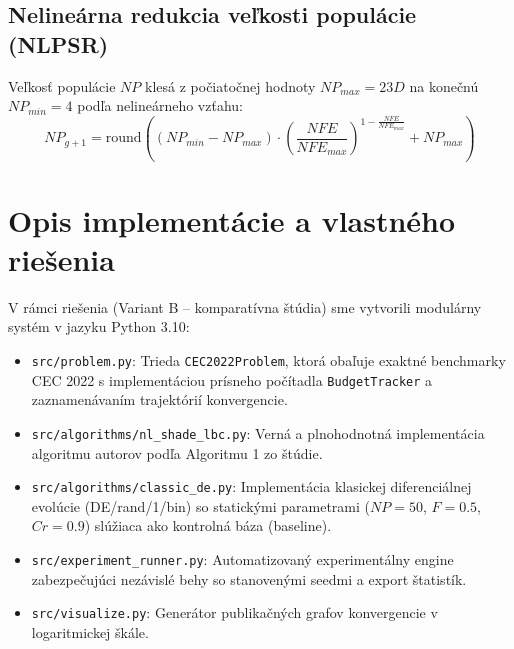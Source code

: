 \documentclass[11pt,a4paper]{article}
\begin{document}
\subsection{Nelineárna redukcia veľkosti populácie (NLPSR)}
Veľkosť populácie $NP$ klesá z počiatočnej hodnoty $NP_{max} = 23D$ na konečnú $NP_{min} = 4$ podľa nelineárneho vzťahu:
\begin{equation}
NP_{g+1} = \text{round}\left( (NP_{min} - NP_{max}) \cdot \left(\frac{NFE}{NFE_{max}}\right)^{1 - \frac{NFE}{NFE_{max}}} + NP_{max} \right)
\end{equation}

\section{Opis implementácie a vlastného riešenia}
V rámci riešenia (Variant B -- komparatívna štúdia) sme vytvorili modulárny systém v jazyku Python 3.10:
\begin{itemize}
    \item \texttt{src/problem.py}: Trieda \texttt{CEC2022Problem}, ktorá obaľuje exaktné benchmarky CEC 2022 s implementáciou prísneho počítadla \texttt{BudgetTracker} a zaznamenávaním trajektórií konvergencie.
    \item \texttt{src/algorithms/nl\_shade\_lbc.py}: Verná a plnohodnotná implementácia algoritmu autorov podľa Algoritmu 1 zo štúdie.
    \item \texttt{src/algorithms/classic\_de.py}: Implementácia klasickej diferenciálnej evolúcie (DE/rand/1/bin) so statickými parametrami ($NP = 50$, $F = 0.5$, $Cr = 0.9$) slúžiaca ako kontrolná báza (baseline).
    \item \texttt{src/experiment\_runner.py}: Automatizovaný experimentálny engine zabezpečujúci nezávislé behy so stanovenými seedmi a export štatistík.
    \item \texttt{src/visualize.py}: Generátor publikačných grafov konvergencie v logaritmickej škále.
\end{itemize}
\end{document}
